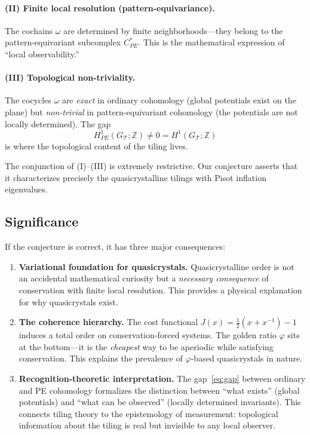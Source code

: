 \documentclass[12pt]{article}
\theoremstyle{definition}
\theoremstyle{remark}
\newcommand{\ZZ}{\mathbb{Z}}
\begin{document}
\paragraph{(II) Finite local resolution (pattern-equivariance).} The cochains $\omega$ are determined by finite neighborhoods---they belong to the pattern-equivariant subcomplex $C^*_{PE}$. This is the mathematical expression of ``local observability.''

\paragraph{(III) Topological non-triviality.} The cocycles $\omega$ are \emph{exact} in ordinary cohomology (global potentials exist on the plane) but \emph{non-trivial} in pattern-equivariant cohomology (the potentials are not locally determined). The gap
\begin{equation}
H^1_{PE}(G_{\mathcal{T}}; \ZZ) \neq 0 = H^1(G_{\mathcal{T}}; \ZZ)
\label{eq:gap}
\end{equation}
is where the topological content of the tiling lives.

The conjunction of (I)--(III) is extremely restrictive. Our conjecture asserts that it characterizes precisely the quasicrystalline tilings with Pisot inflation eigenvalues.

\subsection{Significance}

If the conjecture is correct, it has three major consequences:
\begin{enumerate}
\item \textbf{Variational foundation for quasicrystals.} Quasicrystalline order is not an accidental mathematical curiosity but a \emph{necessary consequence} of conservation with finite local resolution. This provides a physical explanation for why quasicrystals exist.

\item \textbf{The coherence hierarchy.} The cost functional $J(x) = \frac{1}{2}(x + x^{-1}) - 1$ induces a total order on conservation-forced systems. The golden ratio $\varphi$ sits at the bottom---it is the \emph{cheapest} way to be aperiodic while satisfying conservation. This explains the prevalence of $\varphi$-based quasicrystals in nature.

\item \textbf{Recognition-theoretic interpretation.} The gap~\eqref{eq:gap} between ordinary and PE cohomology formalizes the distinction between ``what exists'' (global potentials) and ``what can be observed'' (locally determined invariants). This connects tiling theory to the epistemology of measurement: topological information about the tiling is real but invisible to any local observer.
\end{enumerate}
\end{document}
